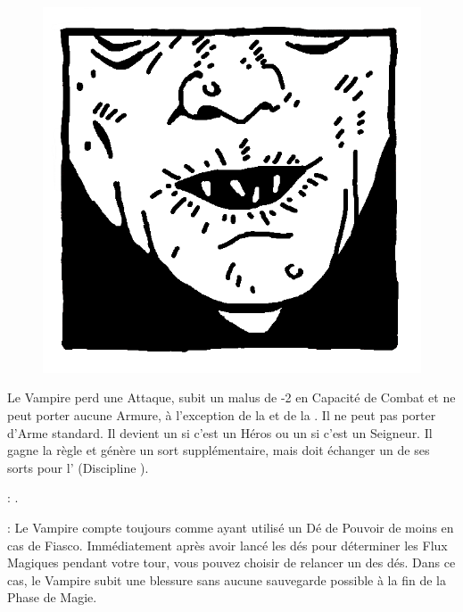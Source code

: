 \begin{figure}
\centering
\includegraphics[width=\logosize]{pics/logo_nosferatu.png}
\end{figure}
Le Vampire perd une Attaque, subit un malus de -2 en Capacité de Combat et ne peut porter aucune Armure, à l'exception de la \mountsprotection{} et de la \innatedefence{}. Il ne peut pas porter d'Arme standard. Il devient un  si c'est un Héros ou un  si c'est un Seigneur. Il gagne la règle \awaken{\skeletons{}, \zombies{}} et génère un sort supplémentaire, mais doit échanger un de ses sorts pour l'\necromancysignature{} (Discipline \necromancy{}).

\vspace{0.5cm}
\bloodties{} : \textbf{\wraiths}.

\vspace{0.5cm}
\ancientbloodpower{} : \textbf{\bloodmagic}\dotfill{}\newline%
Le Vampire compte toujours comme ayant utilisé un Dé de Pouvoir de moins en cas de Fiasco. Immédiatement après avoir lancé les dés pour déterminer les Flux Magiques pendant votre tour, vous pouvez choisir de relancer un des dés. Dans ce cas, le Vampire subit une blessure sans aucune sauvegarde possible à la fin de la Phase de Magie.

\closearmynewsection








